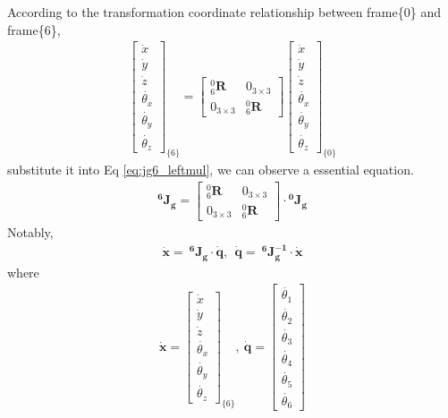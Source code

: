 According to the transformation coordinate relationship between frame\{0\} and frame\{6\},
\begin{equation}
\begin{split}
\begin{bmatrix}
\dot{x}\\ 
\dot{y}\\ 
\dot{z}\\ 
\dot{\theta_x}\\ 
\dot{\theta_y}\\
\dot{\theta_z} 
\end{bmatrix}_{\!\{6\}}
=
\begin{bmatrix}
^0_6\mathbf{R} & 0_{ 3\times 3} \\ 
0_{ 3\times 3} & ^0_6\mathbf{R}
\end{bmatrix}
\begin{bmatrix}
\dot{x}\\ 
\dot{y}\\ 
\dot{z}\\ 
\dot{\theta_x}\\ 
\dot{\theta_y}\\
\dot{\theta_z} 
\end{bmatrix}_{\!\{0\}}
\end{split}
\end{equation}
substitute it into Eq \ref{eq:jg6_leftmul}, we can observe a essential equation.
\begin{equation}
\begin{split}
\mathbf{^6\!J_g}
= 
\begin{bmatrix}
^0_6\mathbf{R} & 0_{ 3\times 3} \\ 
0_{ 3\times 3} & ^0_6\mathbf{R}
\end{bmatrix}
\cdot
\mathbf{^0\!J_g}
\end{split}
\end{equation}
Notably,
\begin{equation}
\label{eq:jg6}
\begin{split}
\boldsymbol{\dot{x}} = \ \mathbf{^6\!J_g} \cdot \boldsymbol{\dot{q}}
,\ \ 
\boldsymbol{\dot{q}} = \ \mathbf{^6\!J_g^{-1}} \cdot \boldsymbol{\dot{x}}
\end{split}
\end{equation}
where
\begin{equation*}
\begin{split}
\boldsymbol{\dot{x}}
=
\begin{bmatrix}
\dot{x}\\
\dot{y}\\
\dot{z}\\
\dot{\theta _x}\\
\dot{\theta _y}\\
\dot{\theta _z}
\end{bmatrix}_{\!\{6\}}
,\ 
\boldsymbol{\dot{q}}
=
\begin{bmatrix}
\dot{\theta _1} \\ 
\dot{\theta _2} \\ 
\dot{\theta _3} \\ 
\dot{\theta _4} \\ 
\dot{\theta _5} \\ 
\dot{\theta _6} 
\end{bmatrix}
\end{split}
\end{equation*}
